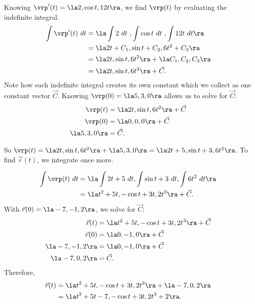 {Knowing $\vrp'(t) = \la 2,\cos t, 12t\ra$, we find $\vrp(t)$ by evaluating the indefinite integral.
\begin{align*}
\int \vrp'(t)\ dt &= \la \int 2\ dt\ , \int \cos t\ dt\ , \int 12t\ dt\ra \\
						&= \la 2t+C_1, \sin t+ C_2, 6t^2 + C_3\ra \\
						&= \la 2t,\sin t,6t^2 \ra + \la C_1,C_2,C_3\ra \\
						&= \la 2t,\sin t,6t^2 \ra + \vec C.
\end{align*}
Note how each indefinite integral creates its own constant which we collect as one constant vector $\vec C$. Knowing $\vrp(0) = \la 5,3,0\ra$ allows us to solve for $\vec C$:
\begin{align*}
\vrp(t) & = \la 2t,\sin t,6t^2 \ra + \vec C\\
\vrp(0) &=   \la 0,0,0 \ra + \vec C\\
\la 5,3,0\ra &= \vec C.
\end{align*}

So $\vrp(t) = \la 2t,\sin t,6t^2\ra + \la 5,3,0\ra = \la 2t+5, \sin t + 3, 6t^2\ra$. To find $\vec r(t)$, we integrate once more.

\begin{align*}
\int \vrp(t)\ dt &= \la \int 2t+5\ dt, \int \sin t + 3\ dt, \int 6t^2\ dt \ra\\
							&= \la t^2+5t, -\cos t + 3t, 2t^3\ra + \vec C.
\end{align*}
With $\vec r(0) = \la -7,-1,2\ra$, we solve for $\vec C$:
\begin{align*}
\vec r(t) &= \la t^2+5t, -\cos t + 3t, 2t^3\ra + \vec C\\
\vec r(0) &= \la 0,-1,0\ra + \vec C\\
\la -7,-1,2\ra &= \la 0,-1,0\ra + \vec C\\
\la -7,0,2\ra &= \vec C.
\end{align*}
Therefore,
\begin{align*}
 \vec r(t) &= \la t^2+5t, -\cos t + 3t, 2t^3\ra + \la -7,0,2\ra \\
 &= \la t^2+5t-7,-\cos t+3t,2t^3+2\ra.
\end{align*}}

